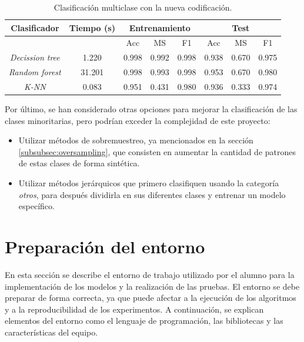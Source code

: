 \begin{table}[th]
	\centering
	\begin{tabular}{ |c|c|c|c|c|c|c|c| }
		\hline
		\rowcolor{LightCyan}
		Clasificador & Tiempo (s) & \multicolumn{3}{c|}{Entrenamiento} & \multicolumn{3}{c|}{Test} \\
		\hline
		\rowcolor{LightCyan}
		&            & Acc & MS & F1 & Acc & MS & F1 \\
		\hline
		\textit{Decission tree} & 1.220  & 0.998 & 0.992 & 0.998 & 0.938 & 0.670 & 0.975 \\
		\textit{Random forest}  & 31.201 & 0.998 & 0.993 & 0.998 & 0.953 & 0.670 & 0.980 \\
		\textit{K-NN}           & 0.083  & 0.951 & 0.431 & 0.980 & 0.936 & 0.333 & 0.974 \\
		\hline
	\end{tabular}
	\caption{Clasificación multiclase con la nueva codificación.}
	\label{tabla:multi_new}
\end{table}

\vspace{1em}

Por último, se han considerado otras opciones para mejorar la clasificación de las clases minoritarias, pero podrían exceder la complejidad de este proyecto:

\begin{itemize}
	\item Utilizar métodos de sobremuestreo, ya mencionados en la sección \ref{subsubsec:oversampling}, que consisten en aumentar la cantidad de patrones de estas clases de forma sintética.
	\item Utilizar métodos jerárquicos que primero clasifiquen usando la categoría \textit{otros}, para después dividirla en sus diferentes clases y entrenar un modelo específico.
\end{itemize}

\section{Preparación del entorno}
\label{sec:prep_entorno}

En esta sección se describe el entorno de trabajo utilizado por el alumno para la implementación de los modelos y la realización de las pruebas. El entorno se debe preparar de forma correcta, ya que puede afectar a la ejecución de los algoritmos y a la reproducibilidad de los experimentos. A continuación, se explican elementos del entorno como el lenguaje de programación, las bibliotecas y las características del equipo.

